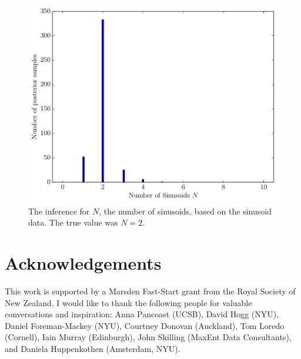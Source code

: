 \documentclass[letterpaper, 11pt]{article}
\begin{document}
\begin{figure}
\begin{center}
\includegraphics[scale=0.5]{N_result.pdf}
\caption{The inference for $N$, the number of sinusoids, based on the
sinusoid data. The true value was $N=2$.
\label{fig:N_result}}
\end{center}
\end{figure}





\section*{Acknowledgements}
This work is supported by a Marsden Fast-Start grant
from the Royal Society of New Zealand. I would like to thank the following
people for valuable conversations and inspiration:
Anna Pancoast (UCSB), David Hogg (NYU), Daniel Foreman-Mackey (NYU),
Courtney Donovan (Auckland), Tom Loredo (Cornell), Iain Murray (Edinburgh),
John Skilling (MaxEnt Data Consultants), and Daniela Huppenkothen
(Amsterdam, NYU).
\end{document}
